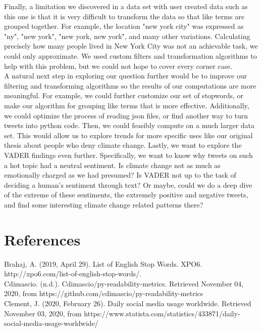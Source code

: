 \documentclass[fontsize=11pt]{article}
\begin{document}
Finally, a limitation we discovered in a data set with user created data such as this one is that it is very difficult to transform the data so that like terms are grouped together. For example, the location "new york city" was expressed as "ny", "new york", "new york, new york", and many other variations. Calculating precisely how many people lived in New York City was not an achievable task, we could only approximate. We used custom filters and transformation algorithms to help with this problem, but we could not hope to cover every corner case. \\

A natural next step in exploring our question further would be to improve our filtering and transforming algorithms so the results of our computations are more meaningful. For example, we could further customize our set of stopwords, or make our algorithm for grouping like terms that is more effective. Additionally, we could optimize the process of reading json files, or find another way to turn tweets into python code. Then, we could feasibly compute on a much larger data set. This would allow us to explore trends for more specific uses like our original thesis about people who deny climate change. Lastly, we want to explore the VADER findings even further. Specifically, we want to know why tweets on such a hot topic had a neutral sentiment. Is climate change not as much as emotionally charged as we had presumed? Is VADER not up to the task of deciding a human's sentiment through text? Or maybe, could we do a deep dive of the extreme of these sentiments, the extremely positive and negative tweets, and find some interesting climate change related patterns there? \\
\newpage

\section*{References}

Brahaj, A. (2019, April 29). List of English Stop Words. XPO6. http://xpo6.com/list-of-english-stop-words/. \\

Cdimascio. (n.d.). Cdimascio/py-readability-metrics. Retrieved November 04, 2020, from https://github.com/cdimascio/py-readability-metrics \\

Clement, J. (2020, February 26). Daily social media usage worldwide. Retrieved November 03, 2020, from https://www.statista.com/statistics/433871/daily-social-media-usage-worldwide/ \\
\end{document}
